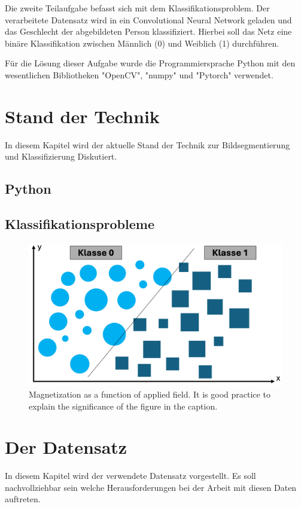 \documentclass[journal,twoside,web]{ieeecolor}
\begin{document}
Die zweite Teilaufgabe befasst sich mit dem Klassifikationsproblem. 
Der verarbeitete Datensatz wird in ein Convolutional Neural Network geladen und das Geschlecht der abgebildeten Person klassifiziert. 
Hierbei soll das Netz eine binäre Klassifikation zwischen Männlich (0) und Weiblich (1) durchführen.

Für die Lösung dieser Aufgabe wurde die Programmiersprache Python mit den wesentlichen Bibliotheken "OpenCV", "numpy" und "Pytorch" verwendet. 

\section{Stand der Technik}
In diesem Kapitel wird der aktuelle Stand der Technik zur Bildsegmentierung und Klassifizierung Diskutiert.

\subsection{Python}


\subsection{Klassifikationsprobleme}

\begin{figure}[!t]
    \centerline{\includegraphics[width=\columnwidth]{Andi/binaere_klassifikation.png}}
    \caption{Magnetization as a function of applied field.
    It is good practice to explain the significance of the figure in the caption.}
    \label{fig:fig1}
\end{figure}



\section{Der Datensatz}
In diesem Kapitel wird der verwendete Datensatz vorgestellt. Es soll nachvollziehbar sein welche Herausforderungen bei der Arbeit mit diesen Daten auftreten. 
\end{document}
